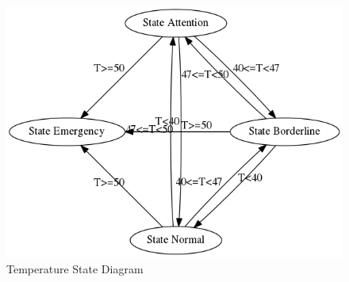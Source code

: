 \documentclass[12pt]{article}
\begin{document}
\begin{figure}[!htbp]
\centering
\includegraphics[scale=0.8]{states.png}
\caption{Temperature State Diagram}
\label{fig:seq_image}
\end{figure}
\end{document}
